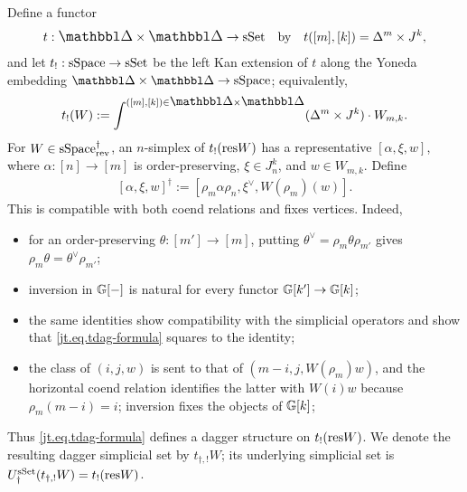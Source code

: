 \documentclass[a4paper,dvipdfmx,11pt]{amsart}
\begin{document}
\begin{construction}
  Define a functor
  \begin{align}
    t:\prism\times\prism\to\sSet
    \quad \text{by} \quad
    t([m],[k])=\Delta^m\times J^k,
  \end{align}
  and let $t_!:\mathrm{sSpace}\to\mathrm{sSet}$ be the left Kan extension of $t$ along the Yoneda embedding $\prism\times\prism\to\sSpace$;
  equivalently,
  \begin{align}
    t_!(W)
    :=
    \int^{([m],[k])\in\prism\times\prism}(\Delta^m\times J^k)\cdot W_{m,k}.
  \end{align}
  For $W\in\mathrm{sSpace}^{\dag}_{\mathrm{rev}}$, an $n$-simplex of $t_!(\mathrm{res} W)$ has a representative $[\alpha,\xi,w]$, where $\alpha:[n]\to[m]$ is order-preserving, $\xi\in J^k_n$, and $w\in W_{m,k}$.
  Define
  \begin{align}\label{jt.eq.tdag-formula}
    [\alpha,\xi,w]^{\dag}
      :=[\rho_m\alpha\rho_n,\xi^\vee,W(\rho_m)(w)].
  \end{align}
  This is compatible with both coend relations and fixes vertices.
  Indeed, 
  \begin{itemize}
    \item for an order-preserving $\theta:[m']\to[m]$, putting $\theta^\vee=\rho_m\theta\rho_{m'}$ gives $\rho_m\theta=\theta^\vee\rho_{m'}$;
    \item inversion in $\mathbb{G}[-]$ is natural for every functor $\mathbb{G}[k']\to\mathbb{G}[k]$;
    \item the same identities show compatibility with the simplicial operators and show that \eqref{jt.eq.tdag-formula} squares to the identity;
    \item the class of $(i,j,w)$ is sent to that of $(m-i,j,W(\rho_m)w)$, and the horizontal coend relation identifies the latter with $W(i)w$ because $\rho_m(m-i)=i$; inversion fixes the objects of $\mathbb{G}[k]$;
  \end{itemize}

  Thus \eqref{jt.eq.tdag-formula} defines a dagger structure on $t_!(\mathrm{res} W)$.
  We denote the resulting dagger simplicial set by $t_{\dag,!}W$;
  its underlying simplicial set is $U_{\dag}^{\mathrm{sSet}}(t_{\dag,!}W) = t_!(\mathrm{res} W)$.
\end{construction}
\end{document}
